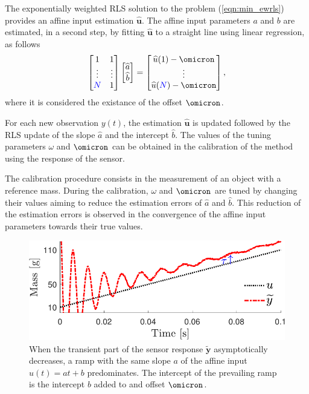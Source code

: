 The exponentially weighted RLS solution to the problem (\ref{eqn:min_ewrls}) provides an affine input  estimation $\widehat{\mathbf{u}}$. 
The affine input parameters $a$ and $b$ are estimated, in a second step, by fitting $\widehat{\mathbf{u}}$ to a straight line using linear regression, as follows
\begin{equation} 
  \begin{bmatrix} 1 & 1  \\ \vdots & \vdots \\ \color{blue}N\color{black} & 1 \end{bmatrix} 
  \begin{bmatrix} \widehat{a} \\ \widehat{b}  \end{bmatrix} = 
  \begin{bmatrix} \widehat{u}(1)-\omicron \\ \vdots \\ \widehat{u}(\color{blue}N\color{black})-\omicron \end{bmatrix}, \label{eqn:LS}
\end{equation}
where it is considered the existance of the offset $\omicron$.   

For each new observation $y(t)$, the estimation $\widehat{\mathbf{u}}$ is updated followed by the RLS update of the slope $\widehat{a}$ and the intercept $\widehat{b}$.
The values of the tuning parameters $\omega$ and $\omicron$ can be obtained in the calibration of the method using the response of the sensor.

The calibration procedure consists in the measurement of an object with a reference mass.
During the calibration, $\omega$ and $\omicron$ are tuned by changing their values aiming to reduce the estimation errors of $\widehat{a}$ and $\widehat{b}$.
This reduction of the estimation errors is observed in the convergence of the affine input parameters towards their true values.

\begin{figure}[!htbp]
\centering
\includegraphics[width=0.69\columnwidth]{./ChapterRampInput/fig/Fig_2_1.pdf} 
\caption{ \label{fig:sensor_response} When the transient part of the sensor response $\widetilde{\mathbf{y}}$ asymptotically decreases, a ramp with the same slope $a$ of the  affine input $u(t) = at+b$ predominates. The intercept of the prevailing ramp is the intercept $b$ added to and offset $\omicron$.}
\end{figure}


